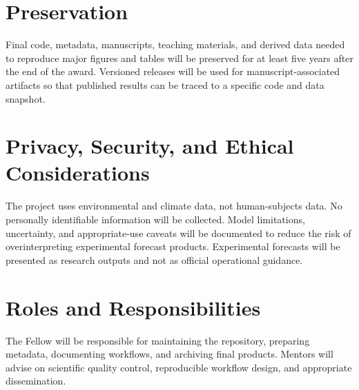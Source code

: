 \documentclass[11pt,letterpaper]{article}
\begin{document}
\section*{Preservation}
Final code, metadata, manuscripts, teaching materials, and derived data needed to reproduce major figures and tables will be preserved for at least five years after the end of the award. Versioned releases will be used for manuscript-associated artifacts so that published results can be traced to a specific code and data snapshot.

\section*{Privacy, Security, and Ethical Considerations}
The project uses environmental and climate data, not human-subjects data. No personally identifiable information will be collected. Model limitations, uncertainty, and appropriate-use caveats will be documented to reduce the risk of overinterpreting experimental forecast products. Experimental forecasts will be presented as research outputs and not as official operational guidance.

\section*{Roles and Responsibilities}
The Fellow will be responsible for maintaining the repository, preparing metadata, documenting workflows, and archiving final products. Mentors will advise on scientific quality control, reproducible workflow design, and appropriate dissemination.
\end{document}
